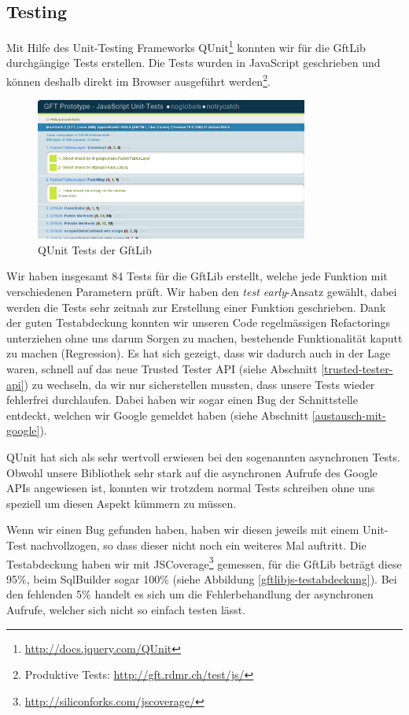 \subsection{Testing}
\label{gftlib-testing}
Mit Hilfe des Unit-Testing Frameworks QUnit\footnote{\url{http://docs.jquery.com/QUnit}} konnten wir für die GftLib durchgängige Tests erstellen. Die Tests wurden in JavaScript geschrieben und können deshalb direkt im Browser ausgeführt werden\footnote{Produktive Tests: \url{http://gft.rdmr.ch/test/js/}}. 

\begin{figure}[!ht]
	\centering
	\includegraphics[width=0.8\textwidth]{images/gftlib-js/gftlibjs-tests}
	\caption{QUnit Tests der GftLib}
	\label{gftlibjs-tests}
\end{figure}

Wir haben insgesamt 84 Tests für die GftLib erstellt, welche jede Funktion mit verschiedenen Parametern prüft. Wir haben den \emph{test early}-Ansatz gewählt, dabei werden die Tests sehr zeitnah zur Erstellung einer Funktion geschrieben. Dank der guten Testabdeckung konnten wir unseren Code regelmässigen Refactorings unterziehen ohne uns darum Sorgen zu machen, bestehende Funktionalität kaputt zu machen (Regression). Es hat sich gezeigt, dass wir dadurch auch in der Lage waren, schnell auf das neue Trusted Tester \gls{API} (siehe Abschnitt \ref{trusted-tester-api}) zu wechseln, da wir nur sicherstellen mussten, dass unsere Tests wieder fehlerfrei durchlaufen. Dabei haben wir sogar einen Bug der Schnittstelle entdeckt, welchen wir Google gemeldet haben (siehe Abschnitt \ref{austausch-mit-google}).

QUnit hat sich als sehr wertvoll erwiesen bei den sogenannten asynchronen Tests. Obwohl unsere Bibliothek sehr stark auf die asynchronen Aufrufe des Google \gls{API}s angewiesen ist, konnten wir trotzdem normal Tests schreiben ohne uns speziell um diesen Aspekt kümmern zu müssen.

Wenn wir einen Bug gefunden haben, haben wir diesen jeweils mit einem Unit-Test nachvollzogen, so dass dieser nicht noch ein weiteres Mal auftritt. Die Testabdeckung haben wir mit JSCoverage\footnote{\url{http://siliconforks.com/jscoverage/}} gemessen, für die GftLib beträgt diese 95\%, beim SqlBuilder sogar 100\% (siehe Abbildung \ref{gftlibjs-testabdeckung}). Bei den fehlenden 5\% handelt es sich um die Fehlerbehandlung der asynchronen Aufrufe, welcher sich nicht so einfach testen lässt.

